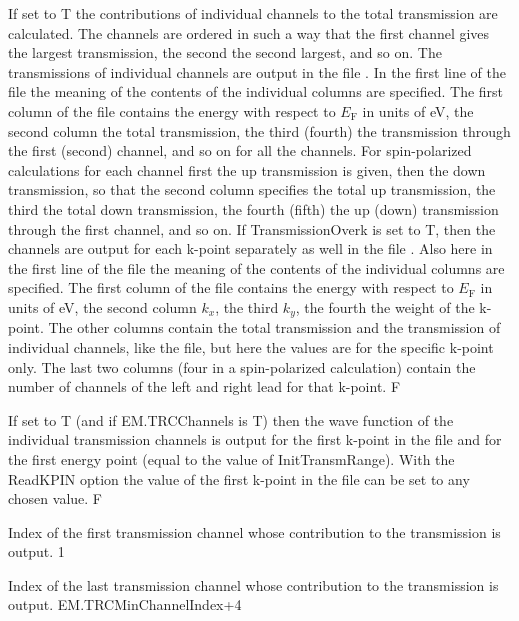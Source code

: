 \documentclass[11pt]{article}
\begin{document}
{\newpage
{}
{If set to T the contributions of individual channels to the total transmission are calculated. The channels are ordered in such a way that the first channel gives the largest transmission, the second the second largest, and so on. The transmissions of individual channels are output in the file . In the first line of the file the meaning of the contents of the individual columns are specified. The first column of the file contains the energy with respect to $E_\mathrm{F}$ in units of eV, the second column the total transmission, the third (fourth) the transmission through the first (second) channel, and so on for all the channels. For spin-polarized calculations for each channel first the up transmission is given, then the down transmission, so that the second column specifies the total up transmission, the third the total down transmission, the fourth (fifth) the up (down) transmission through the first channel, and so on. If TransmissionOverk is set to T, then the channels are output for each k-point separately as well in the file . Also here in the first line of the file the meaning of the contents of the individual columns are specified. The first column of the file contains the energy with respect to $E_\mathrm{F}$ in units of eV, the second column $k_x$, the third $k_y$, the fourth the weight of the k-point. The other columns contain the total transmission and the transmission of individual channels, like the  file, but here the values are for the specific k-point only. The last two columns (four in a spin-polarized calculation) contain the number of channels of the left and right lead for that k-point.}
{F}

{If set to T (and if EM.TRCChannels is T) then the wave function of the individual transmission channels is output for the first k-point in the  file and for the first energy point (equal to the value of InitTransmRange). With the ReadKPIN option the value of the first k-point in the  file can be set to any chosen value.}
{F}

{Index of the first transmission channel whose contribution to the transmission is output.}
{1}

{Index of the last transmission channel whose contribution to the transmission is output.}
{EM.TRCMinChannelIndex+4}

}
\end{document}
